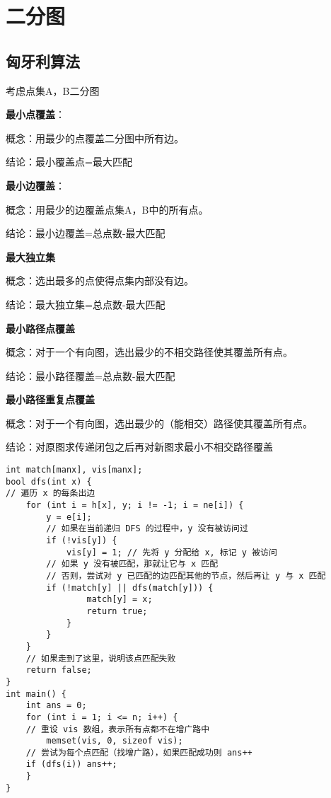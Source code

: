 \section{二分图}
\subsection{匈牙利算法}
\par \noindent 考虑点集A，B二分图
\par \noindent \textbf{最小点覆盖}：
\par \noindent 概念：用最少的点覆盖二分图中所有边。
\par \noindent 结论：最小覆盖点=最大匹配
\par \noindent 
\par \noindent \textbf{最小边覆盖}：
\par \noindent 概念：用最少的边覆盖点集A，B中的所有点。
\par \noindent 结论：最小边覆盖=总点数-最大匹配
\par \noindent 
\par \noindent \textbf{最大独立集}
\par \noindent 概念：选出最多的点使得点集内部没有边。
\par \noindent 结论：最大独立集=总点数-最大匹配
\par \noindent 
\par \noindent \textbf{最小路径点覆盖}
\par \noindent 概念：对于一个有向图，选出最少的不相交路径使其覆盖所有点。
\par \noindent 结论：最小路径覆盖=总点数-最大匹配
\par \noindent 
\par \noindent \textbf{最小路径重复点覆盖}
\par \noindent 概念：对于一个有向图，选出最少的（能相交）路径使其覆盖所有点。
\par \noindent 结论：对原图求传递闭包之后再对新图求最小不相交路径覆盖

\begin{verbatim}
int match[manx], vis[manx];
bool dfs(int x) {
// 遍历 x 的每条出边
    for (int i = h[x], y; i != -1; i = ne[i]) {
        y = e[i];
        // 如果在当前递归 DFS 的过程中，y 没有被访问过
        if (!vis[y]) {
            vis[y] = 1; // 先将 y 分配给 x, 标记 y 被访问
        // 如果 y 没有被匹配，那就让它与 x 匹配
        // 否则，尝试对 y 已匹配的边匹配其他的节点，然后再让 y 与 x 匹配
        if (!match[y] || dfs(match[y])) {
                match[y] = x;
                return true;
            }
        }
    }
    // 如果走到了这里，说明该点匹配失败
    return false;
}
int main() {
    int ans = 0;
    for (int i = 1; i <= n; i++) {
    // 重设 vis 数组，表示所有点都不在增广路中
        memset(vis, 0, sizeof vis);
    // 尝试为每个点匹配（找增广路），如果匹配成功则 ans++
    if (dfs(i)) ans++;
    }
}
\end{verbatim}

